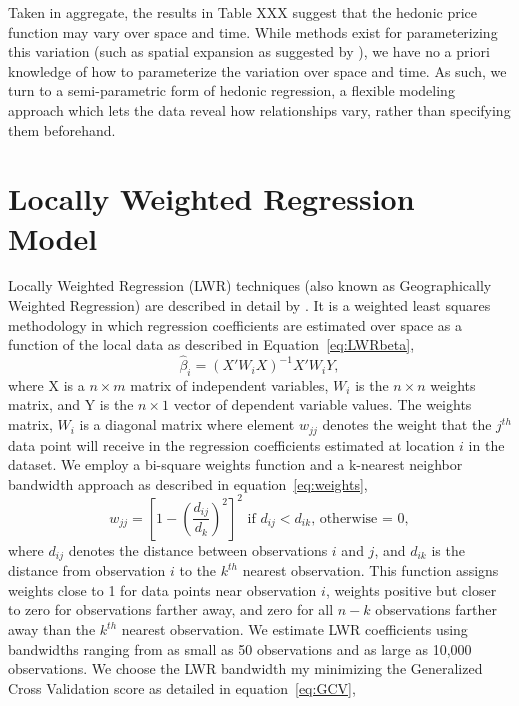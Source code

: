 \documentclass{article}\usepackage{graphicx, color}
\begin{document}
Taken in aggregate, the results in Table XXX suggest that the hedonic price function may vary over space and time. While methods exist for parameterizing this variation (such as spatial expansion as suggested by \citet{Casetti1974}), we have no a priori knowledge of how to parameterize the variation over space and time. As such, we turn to a semi-parametric form of hedonic regression, a flexible modeling approach which lets the data reveal how relationships vary, rather than specifying them beforehand.

\section{Locally Weighted Regression Model}
Locally Weighted Regression (LWR) techniques (also known as Geographically Weighted Regression) are described in detail by \citet{Brunsdon1998b}. It is a weighted least squares methodology in which regression coefficients are estimated over space as a function of the local data as described in Equation~\eqref{eq:LWRbeta},
\begin{equation}\label{eq:LWRbeta}
\hat{\beta}_i = (X'W_iX)^{-1}X'W_iY,
\end{equation}
where X is a $n \times m$ matrix of independent variables, $W_i$ is the $n \times n$ weights matrix, and Y is the $n \times 1$ vector of dependent variable values. The weights matrix, $W_i$ is a diagonal matrix where element $w_{jj}$ denotes the weight that the $j^{th}$ data point will receive in the regression coefficients estimated at location $i$ in the dataset. We employ a bi-square weights function and a k-nearest neighbor bandwidth approach as described in equation~\eqref{eq:weights}, 
\begin{equation}\label{eq:weights}
w_{jj}=\left[1-\left(\frac{d_{ij}}{d_{k}}\right)^2 \right]^2 \textrm{ if  }d_{ij}<d_{ik}\textrm{, otherwise = 0},
\end{equation}
where $d_{ij}$ denotes the distance between observations $i$ and $j$, and $d_{ik}$ is the distance from observation $i$ to the $k^{th}$ nearest observation. This function assigns weights close to 1 for data points near observation $i$, weights positive but closer to zero for observations farther away, and zero for all $n-k$ observations farther away than the $k^{th}$ nearest observation. 
We estimate LWR coefficients using bandwidths ranging from as small as 50 observations and as large as 10,000 observations. We choose the LWR bandwidth my minimizing the Generalized Cross Validation score as detailed in equation~\eqref{eq:GCV},
\end{document}
